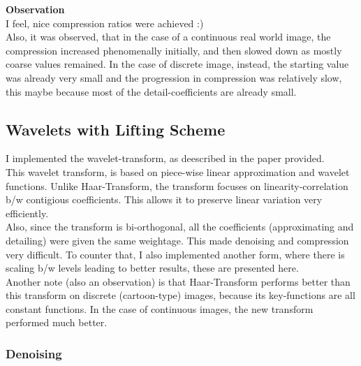 \documentclass{article}
\begin{document}
    \textbf{Observation}\\
    I feel, nice compression ratios were achieved :)\\
    Also, it was observed, that in the case of a continuous real world image, the compression increased phenomenally initially, and then slowed down as mostly coarse values remained. In the case of discrete image, instead, the starting value was already very small and the progression in compression was relatively slow, this maybe because most of the detail-coefficients are already small.
    
\pagebreak
\subsection*{Wavelets with Lifting Scheme}
I implemented the wavelet-transform, as deescribed in the paper provided.\\
This wavelet transform, is based on piece-wise linear approximation and wavelet functions. Unlike Haar-Transform, the transform focuses on linearity-correlation b/w contigious coefficients. This allows it to preserve linear variation very efficiently.\\
Also, since the transform is bi-orthogonal, all the coefficients (approximating and detailing) were given the same weightage. This made denoising and compression very difficult. To counter that, I also implemented another form, where there is scaling b/w levels leading to better results, these are presented here.\\
Another note (also an observation) is that Haar-Transform performs better than this transform on discrete (cartoon-type) images, because its key-functions are all constant functions. In the case of continuous images, the new transform performed much better.\\
\subsubsection*{Denoising}
\end{document}
